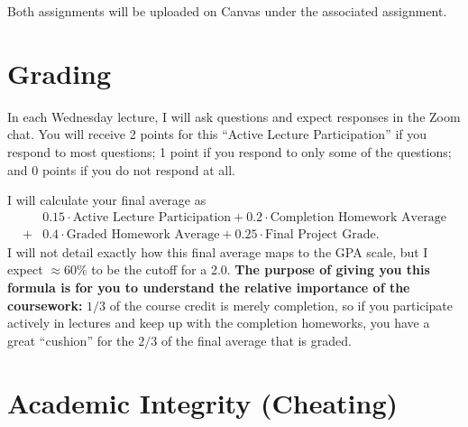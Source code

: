 \documentclass[12pt]{article}
\begin{document}
Both assignments will be uploaded on Canvas under the associated assignment.

\section*{Grading}

In each Wednesday lecture, I will ask questions and expect responses in the Zoom chat. You will receive 2 points for this ``Active Lecture Participation'' if you respond to most questions; 1 point if you respond to only some of the questions; and 0 points if you do not respond at all.

I will calculate your final average as 
\begin{align*}
&0.15 \cdot \text{Active Lecture Participation} + 0.2 \cdot \text{Completion Homework Average} \\ + &0.4 \cdot \text{Graded Homework Average} + 0.25 \cdot \text{Final Project Grade}.
\end{align*}
I will not detail exactly how this final average maps to the GPA scale, but I expect $\approx 60\%$ to be the cutoff for a 2.0. \textbf{The purpose of giving you this formula is for you to understand the relative importance of the coursework:} $1/3$ of the course credit is merely completion, so if you participate actively in lectures and keep up with the completion homeworks, you have a great ``cushion'' for the $2/3$ of the final average that is graded.

\section*{Academic Integrity (Cheating)}
\end{document}
